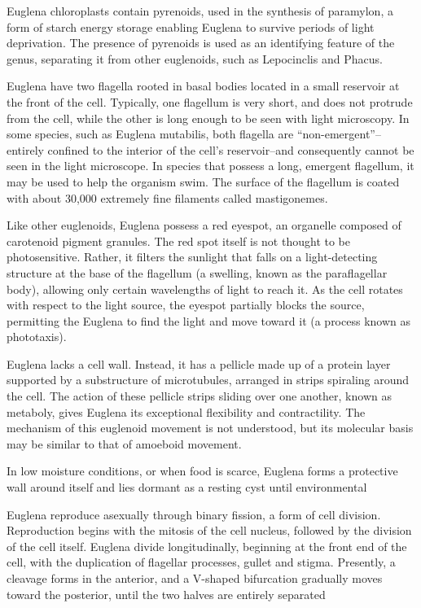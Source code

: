 Euglena chloroplasts contain pyrenoids, used in the synthesis of paramylon, a form of starch energy storage enabling Euglena to survive periods of light deprivation. The presence of pyrenoids is used as an identifying feature of the genus, separating it from other euglenoids, such as Lepocinclis and Phacus.

Euglena have two flagella rooted in basal bodies located in a small reservoir at the front of the cell. Typically, one flagellum is very short, and does not protrude from the cell, while the other is long enough to be seen with light microscopy. In some species, such as Euglena mutabilis, both flagella are ``non-emergent''--entirely confined to the interior of the cell's reservoir--and consequently cannot be seen in the light microscope. In species that possess a long, emergent flagellum, it may be used to help the organism swim. The surface of the flagellum is coated with about 30,000 extremely fine filaments called mastigonemes.

Like other euglenoids, Euglena possess a red eyespot, an organelle composed of carotenoid pigment granules. The red spot itself is not thought to be photosensitive. Rather, it filters the sunlight that falls on a light-detecting structure at the base of the flagellum (a swelling, known as the paraflagellar body), allowing only certain wavelengths of light to reach it. As the cell rotates with respect to the light source, the eyespot partially blocks the source, permitting the Euglena to find the light and move toward it (a process known as phototaxis).

Euglena lacks a cell wall. Instead, it has a pellicle made up of a protein layer supported by a substructure of microtubules, arranged in strips spiraling around the cell. The action of these pellicle strips sliding over one another, known as metaboly, gives Euglena its exceptional flexibility and contractility. The mechanism of this euglenoid movement is not understood, but its molecular basis may be similar to that of amoeboid movement.

In low moisture conditions, or when food is scarce, Euglena forms a protective wall around itself and lies dormant as a resting cyst until environmental

Euglena reproduce asexually through binary fission, a form of cell division. Reproduction begins with the mitosis of the cell nucleus, followed by the division of the cell itself. Euglena divide longitudinally, beginning at the front end of the cell, with the duplication of flagellar processes, gullet and stigma. Presently, a cleavage forms in the anterior, and a V-shaped bifurcation gradually moves toward the posterior, until the two halves are entirely separated

